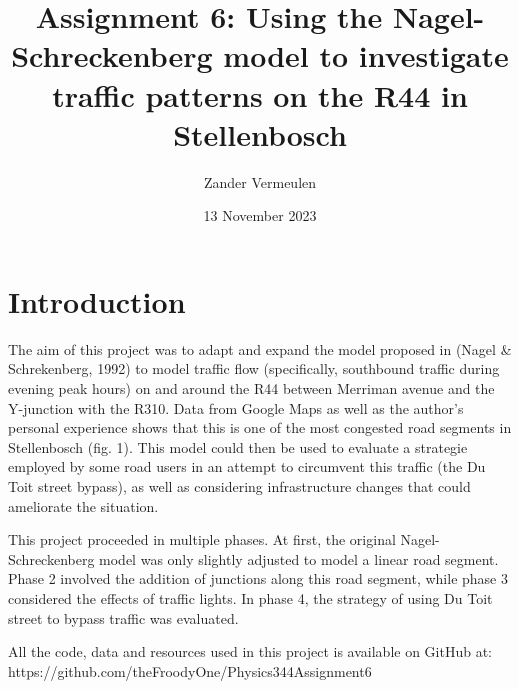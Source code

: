 \documentclass{article}
\title{Assignment 6: Using the Nagel-Schreckenberg model to investigate traffic patterns on the R44 in Stellenbosch}
\author{Zander Vermeulen}
\date{13 November 2023}
\begin{document}
\maketitle

\section*{Introduction}

The aim of this project was to adapt and expand the model proposed in (Nagel \& Schrekenberg, 1992) to model traffic flow (specifically, southbound traffic during evening peak hours) on and around the R44 between Merriman avenue and the Y-junction with the R310. Data from Google Maps as well as the author's personal experience shows that this is one of the most congested road segments in Stellenbosch (fig. 1). This model could then be used to evaluate a strategie employed by some road users in an attempt to circumvent this traffic (the Du Toit street bypass), as well as considering infrastructure changes that could ameliorate the situation.

This project proceeded in multiple phases. At first, the original Nagel-Schreckenberg model was only slightly adjusted to model a linear road segment. Phase 2 involved the addition of junctions along this road segment, while phase 3 considered the effects of traffic lights. In phase 4, the strategy of using Du Toit street to bypass traffic was evaluated.

All the code, data and resources used in this project is available on GitHub at: https://github.com/theFroodyOne/Physics344Assignment6
\end{document}
